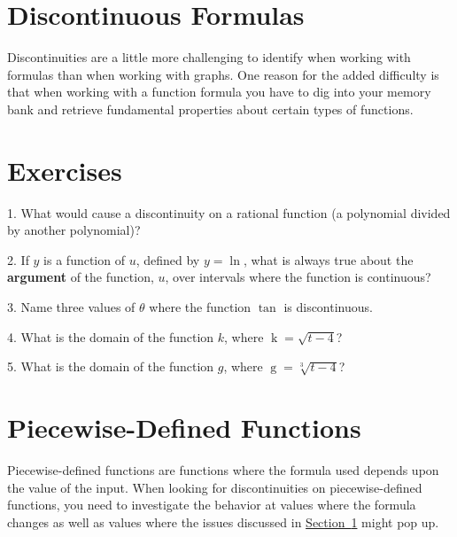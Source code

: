 \documentclass[12pt,]{book}
\newcommand{\terminology}[1]{\textbf{#1}}
\theoremstyle{plain}
\theoremstyle{definition}
\numberwithin{equation}{section}
\providecommand\phantomsection{}
\newcommand{\fe}[2]{\mathop{{#1}{\left(#2\right)}}}
\begin{document}
\section[Discontinuous Formulas]{Discontinuous Formulas}\label{section-discontinuous-formulas}
Discontinuities are a little more challenging to identify when working with formulas than when working with graphs. One reason for the added difficulty is that when working with a function formula you have to dig into your memory bank and retrieve fundamental properties about certain types of functions.%
\typeout{************************************************}
\typeout{************************************************}
\section*{Exercises}\label{exercises-16}

\begin{exerciselist}
\item[1.]\phantomsection\hypertarget{exercise-123}{\null}What would cause a discontinuity on a rational function (a polynomial divided by another polynomial)?%
\par\smallskip
\item[2.]\phantomsection\hypertarget{exercise-124}{\null}If \(y\) is a function of \(u\), defined by \(y=\fe{\ln}{u}\), what is always true about the \terminology{argument} of the function, \(u\), over intervals where the function is continuous?%
\par\smallskip
\item[3.]\phantomsection\hypertarget{exercise-125}{\null}Name three values of \(\theta\) where the function \(\fe{\tan}{\theta}\) is discontinuous.%
\par\smallskip
\item[4.]\phantomsection\hypertarget{exercise-126}{\null}What is the domain of the function \(k\), where \(\fe{k}{t}=\sqrt{t-4}\)?%
\par\smallskip
\item[5.]\phantomsection\hypertarget{exercise-127}{\null}What is the domain of the function \(g\), where \(\fe{g}{t}=\sqrt[3]{t-4}\)?%
\par\smallskip
\end{exerciselist}
\typeout{************************************************}
\typeout{************************************************}
\section[Piecewise-Defined Functions]{Piecewise-Defined Functions}\label{section-piecewise-defined-functions}
Piecewise-defined functions are functions where the formula used depends upon the value of the input. When looking for discontinuities on piecewise-defined functions, you need to investigate the behavior at values where the formula changes as well as values where the issues discussed in \hyperref[section-discontinuous-formulas]{Section~\ref*{section-discontinuous-formulas}} might pop up.%
\typeout{************************************************}
\typeout{************************************************}
\end{document}
